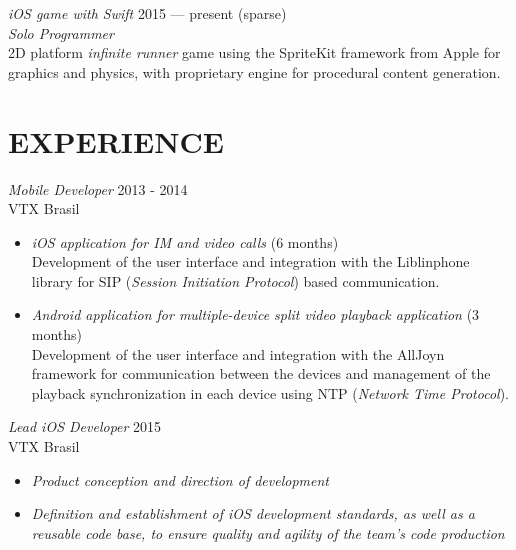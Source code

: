\documentclass[]{res} %
\newcommand{\sbt}{\,\begin{picture}(-1,1)(-2,-3)\circle*{2}\end{picture}\ }
\def \divspace{6pt}
\def \myitemback{0.55cm}
\def \myitemsep{0pt}
\def \mypositionface{\sl}
\def \myprojectface{\it}
\def \myorgface{\sc}
\newif\ifgames
\begin{document}
\begin{resume}
{\myprojectface iOS game with Swift} \hfill 2015 — present (sparse) \\
{\mypositionface Solo Programmer} \\
2D platform {\it infinite runner} game using the SpriteKit framework from Apple for graphics and physics, with proprietary engine for procedural content generation. \ifgames \href{http://mikail.io/runner/}{[link]} \fi


\section{EXPERIENCE \hspace{\divspace} }

{\mypositionface Mobile Developer} \hfill 2013 - 2014 \\
{\myorgface VTX Brasil}

\begin{itemize}[itemsep=\myitemsep,leftmargin=\myitemback]
\item[\sbt] {\it iOS application for IM and video calls} \hfill (6 months)\\
Development of the user interface and integration with the Liblinphone library for SIP ({\it Session Initiation Protocol}) based communication.
\item[\sbt] {\it Android application for multiple-device split video playback application} \hfill (3 months)\\
Development of the user interface and integration with the AllJoyn framework for communication between the devices and management of the playback synchronization in each device using NTP ({\it Network Time Protocol}).
\end{itemize}

{\mypositionface Lead iOS Developer} \hfill 2015\\
{\myorgface VTX Brasil}

\begin{itemize}[itemsep=\myitemsep,leftmargin=\myitemback]
\item[\sbt] {\it Product conception and direction of development}
\item[\sbt] {\it Definition and establishment of iOS development standards, as well as a reusable code base, to ensure quality and agility of the team's code production}


\end{itemize}
\end{resume}
\end{document}
